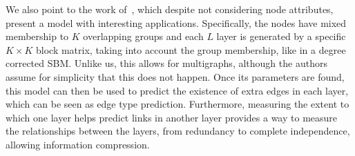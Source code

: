 We also point to the work of~\textcite{DeBacco2017}, which despite not considering node attributes,
present a model with interesting applications. Specifically, the nodes have mixed membership to $K$
overlapping groups and each $L$ layer is generated by a specific $K\times K$ block matrix, taking
into account the group membership, like in a degree corrected SBM. Unlike us, this allows for
multigraphs, although the authors assume for simplicity that this does not happen. Once its
parameters are found, this model can then be used to predict the existence of extra edges in each
layer, which can be seen as edge type prediction. Furthermore, measuring the extent to which one
layer helps predict links in another layer provides a way to measure the relationships between the
layers, from redundancy to complete independence, allowing information compression.
